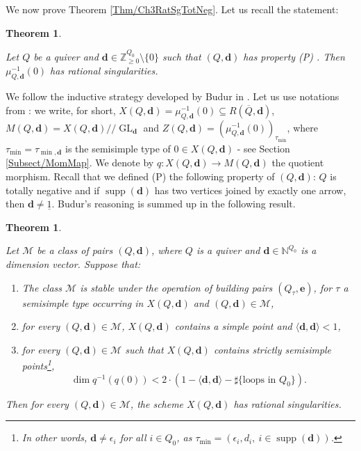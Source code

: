 \documentclass[11pt,english]{article}
\numberwithin{equation}{section}
\numberwithin{figure}{section}
\theoremstyle{definition}
\theoremstyle{plain}
\newtheorem{thm}[df]{Theorem}
\theoremstyle{remark}
\DeclareMathOperator{\GL}{GL}
\DeclareMathOperator{\supp}{supp}
\newcommand\dd{\mathbf{d}}
\newcommand\ee{\mathbf{e}}
\newcommand\ZZ{\mathbb{Z}}
\newcommand\git{/\!\!/}
\begin{document}
We now prove Theorem \ref{Thm/Ch3RatSgTotNeg}. Let us recall the
statement:

\begin{thm} \label{Thm/MainRes}

Let $Q$ be a quiver and $\dd\in\ZZ_{\geq0}^{Q_{0}}\setminus\{0\}$
such that $(Q,\dd)$ has property (P) . Then $\mu_{Q,\dd}^{-1}(0)$
has rational singularities.

\end{thm}

We follow the inductive strategy developed by Budur in \cite{Bud21}.
Let us use notations from \cite{Bud21}: we write, for short, $X(Q,\dd)=\mu_{Q,\dd}^{-1}(0)\subseteq R(\overline{Q},\dd)$,
$M(Q,\dd)=X(Q,\dd)\git\GL_{\dd}$ and $Z(Q,\dd)=\left(\mu_{Q,\dd}^{-1}(0)\right)_{\tau_{\min}}$,
where $\tau_{\min}=\tau_{\min,\dd}$ is the semisimple type of $0\in X(Q,\dd)$
- see Section \ref{Subsect/MomMap}. We denote by $q:X(Q,\dd)\rightarrow M(Q,\dd)$
the quotient morphism. Recall that we defined (P) the following property
of $(Q,\dd)$: $Q$ is totally negative and if $\supp(\dd)$ has two
vertices joined by exactly one arrow, then $\dd\ne\underline{1}$.
Budur's reasoning is summed up in the following result.

\begin{thm}{\cite[Thm. 3.6.]{Bud21}} \label{Thm/BudurInduction}

Let $\mathcal{M}$ be a class of pairs $(Q,\dd)$, where $Q$ is a
quiver and $\dd\in\mathbb{N}^{Q_{0}}$ is a dimension vector. Suppose
that:
\begin{enumerate}
\item The class $\mathcal{M}$ is stable under the operation of building
pairs $(Q_{\tau},\ee)$, for $\tau$ a semisimple type occurring in
$X(Q,\dd)$ and $(Q,\dd)\in\mathcal{M}$,
\item for every $(Q,\dd)\in\mathcal{M}$, $X(Q,\dd)$ contains a simple
point and $\langle\dd,\dd\rangle<1$,
\item for every $(Q,\dd)\in\mathcal{M}$ such that $X(Q,\dd)$ contains
strictly semisimple points\footnote{In other words, $\dd\ne\epsilon_{i}$ for all $i\in Q_{0}$, as $\tau_{\min}=(\epsilon_{i},d_{i},\ i\in\supp(\dd))$.},\[
\dim q^{-1}(q(0))<2\cdot(1-\langle\dd,\dd\rangle-\sharp\{\text{loops in } Q_0\}).
\]
\end{enumerate}
Then for every $(Q,\dd)\in\mathcal{M}$, the scheme $X(Q,\dd)$ has
rational singularities.

\end{thm}
\end{document}
